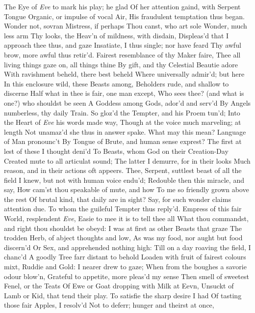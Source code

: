\documentclass[11pt]{book}
\newcounter {first}
\begin{document}
The Eye of \textit{Eve} to mark his play; he glad 
Of her attention gaind, with Serpent Tongue 
Organic, or impulse of vocal Air, 
His fraudulent temptation thus began. 
\quad Wonder not, sovran Mistress, if perhaps 
Thou canst, who art sole Wonder, much less arm 
Thy looks, the Heav'n of mildness, with disdain, 
Displeas'd that I approach thee thus, and gaze 
Insatiate, I thus single; nor have feard 
Thy awful brow, more awful thus retir'd. 
Fairest resemblance of thy Maker faire, 
Thee all living things gaze on, all things thine 
By gift, and thy Celestial Beautie adore 
With ravishment beheld, there best beheld 
Where universally admir'd; but here 
In this enclosure wild, these Beasts among, 
Beholders rude, and shallow to discerne 
Half what in thee is fair, one man except, 
Who sees thee? (and what is one?) who shouldst be seen 
A Goddess among Gods, ador'd and serv'd 
By Angels numberless, thy daily Train. 
\quad So gloz'd the Tempter, and his Proem tun'd; 
Into the Heart of \textit{Eve} his words made way, 
Though at the voice much marveling; at length 
Not unamaz'd she thus in answer spake. 
What may this mean?  Language of Man pronounc't 
By Tongue of Brute, and human sense exprest? 
The first at lest of these I thought deni'd 
To Beasts, whom God on their Creation-Day 
Created mute to all articulat sound; 
The latter I demurre, for in their looks 
Much reason, and in their actions oft appeers. 
Thee, Serpent, suttlest beast of all the field 
I knew, but not with human voice endu'd; 
Redouble then this miracle, and say, 
How cam'st thou speakable of mute, and how 
To me so friendly grown above the rest 
Of brutal kind, that daily are in sight? 
Say, for such wonder claims attention due. 
\quad To whom the guileful Tempter thus reply'd. 
Empress of this fair World, resplendent \textit{Eve}, 
Easie to mee it is to tell thee all 
What thou commandst, and right thou shouldst be obeyd: 
I was at first as other Beasts that graze 
The trodden Herb, of abject thoughts and low, 
As was my food, nor aught but food discern'd 
Or Sex, and apprehended nothing high: 
Till on a day roaving the field, I chanc'd 
A goodly Tree farr distant to behold 
Loaden with fruit of fairest colours mixt, 
Ruddie and Gold: I nearer drew to gaze; 
When from the boughes a savorie odour blow'n, 
Grateful to appetite, more pleas'd my sense 
Then smell of sweetest Fenel, or the Teats 
Of Ewe or Goat dropping with Milk at Eevn, 
Unsuckt of Lamb or Kid, that tend their play. 
To satisfie the sharp desire I had 
Of tasting those fair Apples, I resolv'd 
Not to deferr; hunger and theirst at once, 
\end{document}
